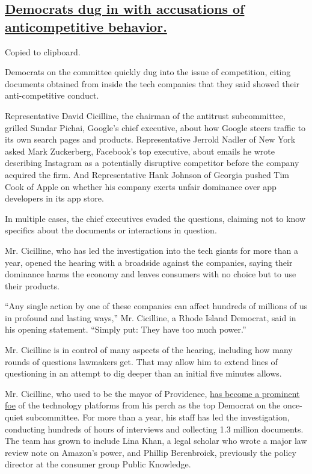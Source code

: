 \hypertarget{democrats-dug-in-with-accusations-of-anticompetitive-behavior}{%
\subsection{\texorpdfstring{\protect\hyperlink{democrats-dug-in-with-accusations-of-anticompetitive-behavior}{Democrats
dug in with accusations of anticompetitive
behavior.}}{Democrats dug in with accusations of anticompetitive behavior.}}\label{democrats-dug-in-with-accusations-of-anticompetitive-behavior}}

Copied to clipboard.

Democrats on the committee quickly dug into the issue of competition,
citing documents obtained from inside the tech companies that they said
showed their anti-competitive conduct.

Representative David Cicilline, the chairman of the antitrust
subcommittee, grilled Sundar Pichai, Google's chief executive, about how
Google steers traffic to its own search pages and products.
Representative Jerrold Nadler of New York asked Mark Zuckerberg,
Facebook's top executive, about emails he wrote describing Instagram as
a potentially disruptive competitor before the company acquired the
firm. And Representative Hank Johnson of Georgia pushed Tim Cook of
Apple on whether his company exerts unfair dominance over app developers
in its app store.

In multiple cases, the chief executives evaded the questions, claiming
not to know specifics about the documents or interactions in question.

Mr. Cicilline, who has led the investigation into the tech giants for
more than a year, opened the hearing with a broadside against the
companies, saying their dominance harms the economy and leaves consumers
with no choice but to use their products.

``Any single action by one of these companies can affect hundreds of
millions of us in profound and lasting ways,'' Mr. Cicilline, a Rhode
Island Democrat, said in his opening statement. ``Simply put: They have
too much power.''

Mr. Cicilline is in control of many aspects of the hearing, including
how many rounds of questions lawmakers get. That may allow him to extend
lines of questioning in an attempt to dig deeper than an initial five
minutes allows.

Mr. Cicilline, who used to be the mayor of Providence,
\href{https://slack-redir.net/link?url=https\%3A\%2F\%2Fwww.nytimes.com\%2F2019\%2F12\%2F08\%2Ftechnology\%2FDavid-Cicilline-antitrust-tech.html}{has
become a prominent foe} of the technology platforms from his perch as
the top Democrat on the once-quiet subcommittee. For more than a year,
his staff has led the investigation, conducting hundreds of hours of
interviews and collecting 1.3 million documents. The team has grown to
include Lina Khan, a legal scholar who wrote a major law review note on
Amazon's power, and Phillip Berenbroick, previously the policy director
at the consumer group Public Knowledge.

